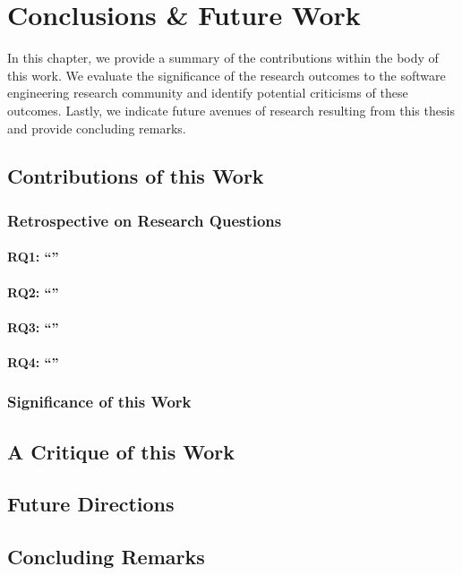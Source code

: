 \chapter{Conclusions \& Future Work}
\label{ch:conclusions}

In this chapter, we provide a summary of the contributions within the body of this work. We evaluate the significance of the research outcomes to the software engineering research community and identify potential criticisms of these outcomes. Lastly, we indicate future avenues of research resulting from this thesis and provide concluding remarks.

\section{Contributions of this Work}

\subsection{Retrospective on Research Questions}

\subsubsection[Answering RQ1]{RQ1: ``\RQOneTextLandscapeAnalysis{}''}

\subsubsection[Answering RQ2]{RQ2: ``\RQTwoTextDocumentation{}''}

\subsubsection[Answering RQ3]{RQ3: ``\RQThreeTextDevMiscomprehension{}''}

\subsubsection[Answering RQ4]{RQ4: ``\RQFourDesign{}''}

\subsection{Significance of this Work}

\section{A Critique of this Work}

\section{Future Directions}

\section{Concluding Remarks}

